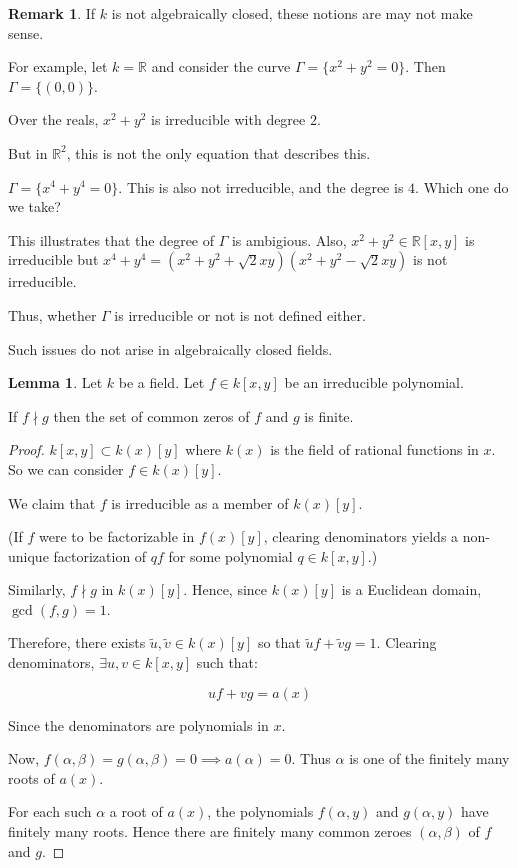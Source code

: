 \documentclass{article}
\theoremstyle{definition}
\newtheorem{lemma}[theorem]{Lemma}
\newtheorem*{remark}{Remark}
\begin{document}
    \begin{remark}
        If \(k\) is not algebraically closed, these notions are may not make sense.

        For example, let \(k = \mathbb{R}\) and consider the curve \(\Gamma = \{ x^2 + y^2 = 0 \}\). Then \(\Gamma = \{ (0,0) \}\).

        Over the reals, \(x^2 + y^2\) is irreducible with degree \(2\).

        But in \(\mathbb{R}^2\), this is not the only equation that describes this.

        \(\Gamma = \{ x^4 + y^4 = 0 \}\). This is also not irreducible, and the degree is \(4\). Which one do we take?

        This illustrates that the degree of \(\Gamma\) is ambigious. Also, \(x^2 + y^2 \in \mathbb{R}[x,y]\) is irreducible but \(x^4 + y^4 = (x^2 + y^2 + \sqrt{2}xy)(x^2 + y^2 - \sqrt{2}xy)\) is not irreducible.
        
        Thus, whether \(\Gamma\) is irreducible or not is not defined either.

        Such issues do not arise in algebraically closed fields.
    \end{remark}

    \begin{lemma}
        Let \(k\) be a field. Let \(f\in k[x,y]\) be an irreducible polynomial.

        If \(f\nmid g\) then the set of common zeros of \(f\) and \(g\) is finite.
    \end{lemma}

    \begin{proof}
        \(k[x,y] \subset k(x)[y]\) where \(k(x)\) is the field of rational functions in \(x\). So we can consider \(f\in k(x)[y]\).
        
        
        We claim that \(f\) is irreducible as a member of \(k(x)[y]\).

        (If \(f\) were to be factorizable in \(f(x)[y]\), clearing denominators yields a non-unique factorization of \(qf\) for some polynomial \(q\in k[x,y]\).)

        Similarly, \(f\nmid g\) in \(k(x)[y]\). Hence, since \(k(x)[y]\) is a Euclidean domain, \(\gcd(f,g) = 1\).

        Therefore, there exists \(\widetilde{u}, \widetilde{v} \in k(x)[y]\) so that \(\widetilde{u} f + \widetilde{v} g = 1\). Clearing denominators, \(\exists u,v\in k[x,y]\) such that:

        \[
            uf + vg = a(x)
        \]

        Since the denominators are polynomials in \(x\).

        Now, \(f(\alpha,\beta) = g(\alpha, \beta) = 0 \implies a(\alpha)=0\). Thus \(\alpha\) is one of the finitely many roots of \(a(x)\).

        For each such \(\alpha\) a root of \(a(x)\), the polynomials \(f(\alpha, y)\) and \(g(\alpha,y)\) have finitely many roots. Hence there are finitely many common zeroes \((\alpha, \beta)\) of \(f\) and \(g\).

    \end{proof}
\end{document}
